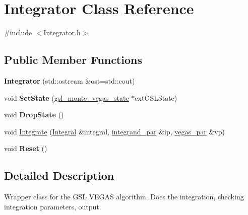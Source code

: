 \hypertarget{classIntegrator}{\section{Integrator Class Reference}
\label{classIntegrator}
}


{\ttfamily \#include $<$Integrator.\-h$>$}

\subsection*{Public Member Functions}
\begin{DoxyCompactItemize}
\item 
\hypertarget{classIntegrator_a410d73f69871a01a49401a6705325a46}{{\bfseries Integrator} (std\-::ostream \&ost=std\-::cout)}\label{classIntegrator_a410d73f69871a01a49401a6705325a46}

\item 
\hypertarget{classIntegrator_aa4e70784278ed8a0e07bb59a153a4098}{void {\bfseries Set\-State} (\hyperlink{structgsl__monte__vegas__state}{gsl\-\_\-monte\-\_\-vegas\-\_\-state} $\ast$ext\-G\-S\-L\-State)}\label{classIntegrator_aa4e70784278ed8a0e07bb59a153a4098}

\item 
\hypertarget{classIntegrator_a7abd0680a883e614c1e6344c8fda5360}{void {\bfseries Drop\-State} ()}\label{classIntegrator_a7abd0680a883e614c1e6344c8fda5360}

\item 
void \hyperlink{classIntegrator_a999142aeac7e98ab084eaad2c257a233}{Integrate} (\hyperlink{classIntegral}{Integral} \&integral, \hyperlink{classintegrand__par}{integrand\-\_\-par} \&ip, \hyperlink{classvegas__par}{vegas\-\_\-par} \&vp)
\item 
\hypertarget{classIntegrator_ac9ea33447f83278d1bd1dd37ac70e30e}{void {\bfseries Reset} ()}\label{classIntegrator_ac9ea33447f83278d1bd1dd37ac70e30e}

\end{DoxyCompactItemize}


\subsection{Detailed Description}
Wrapper class for the G\-S\-L V\-E\-G\-A\-S algorithm. Does the integration, checking integration parameters, output. 


